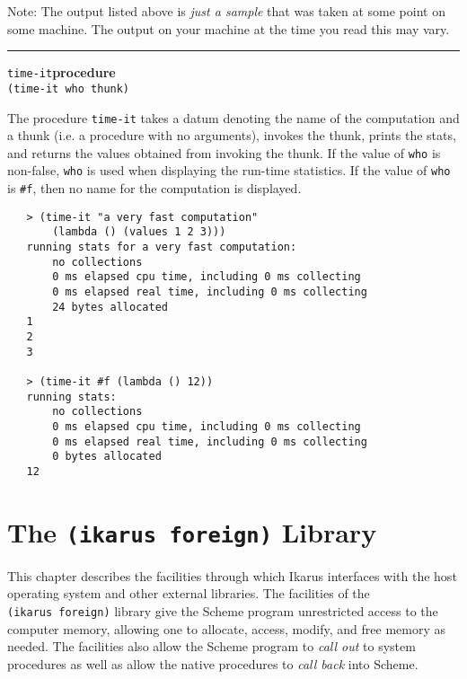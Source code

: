 \documentclass[onecolumn, 12pt, twoside, openright, dvipdfm]{book}
\makeatletter
\newcommand{\idxlabeldefun}[5]{
\vspace{1ex}
\rule{\textwidth}{2pt}
{\phantomsection\index{#1@\texttt{#2}}\label{#3}{\Large\texttt{#4}}\hfill\textbf{#5}}\\}
\newcommand{\idxdefun}[3]{\idxlabeldefun{#1}{#2}{#1}{#2}{#3}}
\newcommand{\defun}[2]{\idxdefun{#1}{#1}{#2}}
\makeatother
\begin{document}
Note: The  output listed above is \emph{just a sample} that was
taken at some point on some machine.  The output on your
machine at the time you read this may vary.

\newpage
\defun{time-it}{procedure}
\texttt{(time-it who thunk)}

The procedure \texttt{time-it} takes a datum denoting the name of
the computation and a thunk (i.e. a
procedure with no arguments), invokes the thunk, prints the stats,
and returns the values obtained from invoking the thunk.  
If the value of \texttt{who} is non-false, \texttt{who}
is used when displaying the run-time statistics.  If the value of
\texttt{who} is \texttt{\#f}, then no name for the computation is
displayed.

\begin{verbatim}
   > (time-it "a very fast computation"
       (lambda () (values 1 2 3)))
   running stats for a very fast computation:
       no collections
       0 ms elapsed cpu time, including 0 ms collecting
       0 ms elapsed real time, including 0 ms collecting
       24 bytes allocated
   1
   2
   3

   > (time-it #f (lambda () 12))
   running stats:
       no collections
       0 ms elapsed cpu time, including 0 ms collecting
       0 ms elapsed real time, including 0 ms collecting
       0 bytes allocated
   12
\end{verbatim}

\chapter{\label{chapter:foreign}The \texttt{(ikarus foreign)} Library}

This chapter describes the facilities through which Ikarus
interfaces with the host operating system and other external
libraries.  The facilities of the \texttt{(ikarus~foreign)}
library give the Scheme program unrestricted access to the computer
memory, allowing one to allocate, access, modify, and free memory as
needed.  The facilities also allow the Scheme program to \emph{call
out} to system procedures as well as allow the native procedures to
\emph{call back} into Scheme.  
\end{document}

